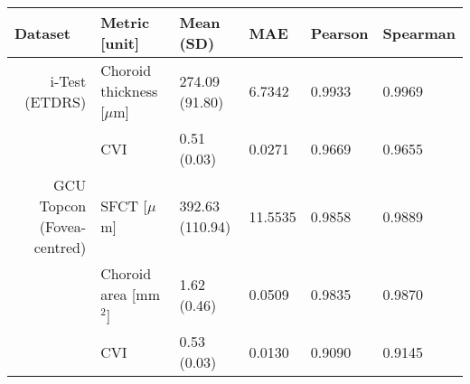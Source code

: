 
\begin{tabular}{rlllll}
\toprule
\multicolumn{1}{l}{Dataset} & Metric [unit] & Mean (\acrshort{SD}) & \acrshort{MAE} & Pearson & Spearman\\
\midrule
\multirow{1}{2.75cm}{i-Test (\acrshort{ETDRS})} & Choroid thickness [$\mu$m] & 274.09 (91.80) & 6.7342 & 0.9933 & 0.9969 \\
 & \acrshort{CVI} & 0.51 (0.03) & 0.0271 & 0.9669 & 0.9655 \\
 \cmidrule(l){2-6}
\multirow{1}{2.75cm}{\acrshort{GCU} Topcon (Fovea-centred)} & \acrshort{SFCT} {[}$\mu$m{]} & 392.63 (110.94) & 11.5535 & 0.9858 & 0.9889 \\
 & Choroid area {[}mm$^2${]} & 1.62 (0.46) & 0.0509 & 0.9835 & 0.9870 \\
 & \acrshort{CVI} & 0.53 (0.03) & 0.0130 & 0.9090 & 0.9145 \\
 \bottomrule
\end{tabular}
